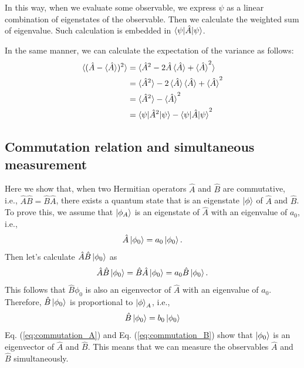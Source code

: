In this way, when we evaluate some observable, we express $\psi$ as a linear combination of eigenstates of the observable. Then we calculate the weighted sum of eigenvalue. Such calculation is embedded in $\braket{\psi|\hat A|\psi}$.

In the same manner, we can calculate the expectation of the variance as follows:
\begin{equation}
  \begin{aligned}
  	\braket{(\hat A - \braket{\hat A})^2} &= \braket{\hat A^2 - 2\hat A\braket{\hat A} + \braket{\hat A}^2}\\
  	&= \braket {\hat A^2} - 2\braket{\hat A}\braket{\hat A} + \braket {\hat A}^2\\
  	&= \braket {\hat A^2} - \braket {\hat A}^2\\
  	&= \braket{\psi|\hat A^2|\psi} - \braket{\psi|\hat A|\psi}^2
  \end{aligned}
\end{equation}

\subsection{Commutation relation and simultaneous measurement}

Here we show that, when two Hermitian operators $\hat A$ and $\hat B$ are commutative, i.e., $\hat A \hat B = \hat B \hat A$, there exists a quantum state that is an eigenstate $\ket \phi$ of $\hat A$ and $\hat B$. To prove this, we assume that $\ket {\phi_A}$ is an eigenstate of $\hat A$ with an eigenvalue of $a_0$, i.e., 
\begin{equation}
  \hat A\ket {\phi_0} = a_0 \ket{\phi_0}.
  \label{eq:commutation_A}
\end{equation}
Then let's calculate $\hat A\hat B \ket {\phi_0}$ as
\begin{equation}
  \hat A \hat B \ket{\phi_0} = \hat B \hat A \ket{\phi_0} = a_0 \hat B \ket{\phi_0}.
\end{equation}
This follows that $\hat B \phi_0$ is also an eigenvector of $\hat A$ with an eigenvalue of $a_0$. Therefore, $\hat B\ket{\phi_0}$ is proportional to $\ket \phi_A$, i.e.,
\begin{equation}
  \hat B \ket{\phi_0} = b_0 \ket{\phi_0}
  \label{eq:commutation_B}
\end{equation}
Eq. (\ref{eq:commutation_A}) and Eq. (\ref{eq:commutation_B}) show that $\ket {\phi_0}$ is an eigenvector of $\hat A$ and $\hat B$. This means that we can measure the observables $\hat A$ and $\hat B$ simultaneously. 

